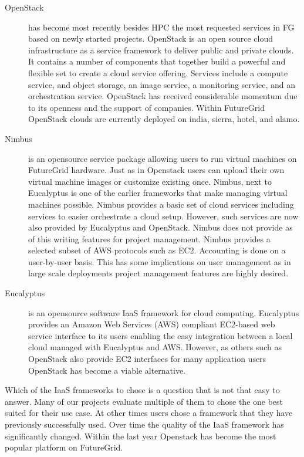 \documentclass{article}
\begin{document}
\begin{description}
\item [OpenStack] has become most recently besides HPC the most requested services in FG based on newly started projects. OpenStack is an open source cloud infrastructure as a service framework to deliver public and private clouds. It contains a number of components that together build a powerful and flexible set to create a cloud service offering. Services include a compute service, and object storage, an image service, a monitoring service, and an orchestration service. OpenStack has received considerable momentum due to its openness and the support of companies. Within FutureGrid OpenStack clouds are currently deployed on india, sierra, hotel, and alamo.  

\item [Nimbus] is an opensource service package allowing users to run virtual machines on FutureGrid hardware. Just as in Openstack users can upload their own virtual machine images or customize existing once. Nimbus, next to Eucalyptus is one of the earlier frameworks that make managing virtual machines possible. Nimbus provides a basic set of cloud services including services to easier orchestrate a cloud setup. However, such services are now also provided by Eucalyptus and OpenStack. Nimbus does not provide as of this writing features for project management. Nimbus provides a selected subset of AWS protocols such as EC2. Accounting is done on a user-by-user basis. This has some implications on user management as in large scale deployments project management features are highly desired.

\item [Eucalyptus] is an opensource software IaaS framework for cloud computing. Eucalyptus provides an Amazon Web Services (AWS) compliant EC2-based web service interface to its users enabling the easy integration between a local cloud managed with Eucalyptus and AWS. However, as others such as OpenStack also provide EC2 interfaces for many application users OpenStack has become a viable alternative.

\end{description}

Which of the IaaS frameworks to chose is a question that is not that easy to answer. Many of our projects evaluate multiple of them to chose the one best suited for their use case. At other times users chose a framework that they have previously successfully used. Over time the quality of the IaaS framework has significantly changed. Within the last year Openstack has become the most popular  platform on FutureGrid.
\end{document}
